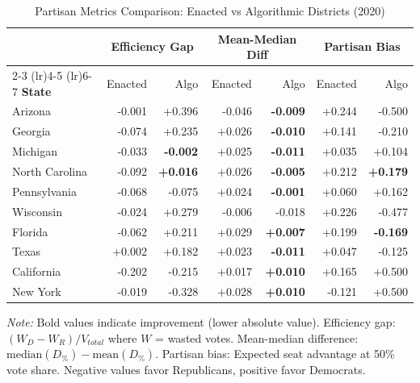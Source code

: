 \begin{table}[t]
\caption{Partisan Metrics Comparison: Enacted vs Algorithmic Districts (2020)}
\label{tab:partisan-comparison}
\centering
\small
\begin{tabular}{@{}lrrrrrr@{}}
\toprule
& \multicolumn{2}{c}{\textbf{Efficiency Gap}} & \multicolumn{2}{c}{\textbf{Mean-Median Diff}} & \multicolumn{2}{c}{\textbf{Partisan Bias}} \\
\cmidrule(lr){2-3} \cmidrule(lr){4-5} \cmidrule(lr){6-7}
\textbf{State} & Enacted & Algo & Enacted & Algo & Enacted & Algo \\
\midrule
Arizona & -0.001 & +0.396 & -0.046 & \textbf{-0.009} & +0.244 & -0.500 \\
Georgia & -0.074 & +0.235 & +0.026 & \textbf{-0.010} & +0.141 & -0.210 \\
Michigan & -0.033 & \textbf{-0.002} & +0.025 & \textbf{-0.011} & +0.035 & +0.104 \\
North Carolina & -0.092 & \textbf{+0.016} & +0.026 & \textbf{-0.005} & +0.212 & \textbf{+0.179} \\
Pennsylvania & -0.068 & -0.075 & +0.024 & \textbf{-0.001} & +0.060 & +0.162 \\
Wisconsin & -0.024 & +0.279 & -0.006 & -0.018 & +0.226 & -0.477 \\
Florida & -0.062 & +0.211 & +0.029 & \textbf{+0.007} & +0.199 & \textbf{-0.169} \\
Texas & +0.002 & +0.182 & +0.023 & \textbf{-0.011} & +0.047 & -0.125 \\
California & -0.202 & -0.215 & +0.017 & \textbf{+0.010} & +0.165 & +0.500 \\
New York & -0.019 & -0.328 & +0.028 & \textbf{+0.010} & -0.121 & +0.500 \\
\bottomrule
\end{tabular}
\vspace{0.5em}

\footnotesize
\textit{Note:} Bold values indicate improvement (lower absolute value).
Efficiency gap: $(W_D - W_R) / V_{total}$ where $W$ = wasted votes.
Mean-median difference: $\text{median}(D_\%) - \text{mean}(D_\%)$.
Partisan bias: Expected seat advantage at 50\% vote share.
Negative values favor Republicans, positive favor Democrats.
\end{table}
